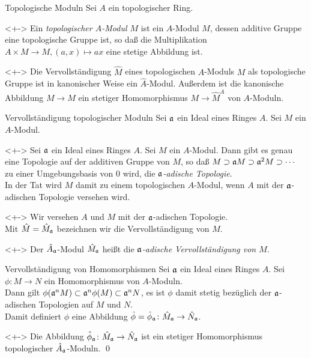 \begin{frame}{Topologische Moduln}
	Sei \(A\) ein topologischer Ring. 
	\begin{definition}<+->
		Ein \emph{topologischer \(A\)-Modul \(M\)} ist ein \(A\)-Modul \(M\), dessen
		additive Gruppe eine topologische Gruppe ist, so daß die Multiplikation \(A \times M \to M, (a, x) \mapsto a x\)
		eine stetige Abbildung ist.
	\end{definition}
	\begin{remark}<+->
		Die Vervollständigung \(\hat M\) eines topologischen \(A\)-Moduls \(M\) als topologische Gruppe ist in kanonischer Weise
		ein \(\hat A\)-Modul. Außerdem ist die kanonische Abbildung \(M \to \hat M\) ein stetiger Homomorphismus
		\(M \to \hat M^{A}\) von \(A\)-Moduln.
	\end{remark}
\end{frame}

\begin{frame}{Vervollständigung topologischer Moduln}
	Sei \(\mathfrak{a}\) ein Ideal eines Ringes \(A\). Sei \(M\) ein \(A\)-Modul. 
	\begin{example}<+->
		Sei \(\mathfrak{a}\) ein Ideal eines Ringes \(A\). Sei \(M\) ein \(A\)-Modul. Dann gibt es genau eine Topologie
		auf der additiven Gruppe von \(M\), so daß \(M \supset \mathfrak{a} M \supset \mathfrak{a}^2 M \supset \dotsb\) zu einer
		Umgebungsbasis von \(0\) wird, die \emph{\(\mathfrak{a}\)-adische Topologie}.
		\\
		In der Tat wird \(M\) damit zu einem topologischen \(A\)-Modul, wenn \(A\) mit der \(\mathfrak{a}\)-adischen Topologie
		versehen wird.
	\end{example}
	\begin{visibleenv}<+->
		Wir versehen \(A\) und \(M\) mit der
		\(\mathfrak{a}\)-adischen Topologie.
		\\
		Mit \(\hat M = \hat M_{\mathfrak{a}}\) bezeichnen wir die Vervollständigung von \(M\).
	\end{visibleenv}
	\begin{definition}<+->
		Der \(\hat A_{\mathfrak{a}}\)-Modul \(\hat M_{\mathfrak{a}}\) heißt die \emph{\(\mathfrak{a}\)-adische Vervollständigung von \(M\)}.
	\end{definition}
\end{frame}

\begin{frame}{Vervollständigung von Homomorphismen}
	Sei \(\mathfrak{a}\) ein Ideal eines Ringes \(A\). Sei \(\phi\colon M \to N\) ein Homomorphismus von \(A\)-Moduln.
	\\
	Dann gilt \(\phi(\mathfrak{a}^n M) \subset \mathfrak{a}^n \phi(M) \subset \mathfrak{a}^n N\), es ist
	\(\phi\) damit stetig bezüglich der \(\mathfrak{a}\)-adischen Topologien auf \(M\) und \(N\).
	\\
	Damit definiert \(\phi\) eine Abbildung \(\hat\phi = \hat\phi_{\mathfrak{a}}\colon \hat M_{\mathfrak{a}} \to \hat N_{\mathfrak{a}}\).
	\begin{proposition}<+->
		Die Abbildung \(\hat\phi_{\mathfrak{a}}\colon \hat M_{\mathfrak{a}} \to \hat N_{\mathfrak{a}}\) ist ein stetiger
		Homomorphismus topologischer \(\hat A_{\mathfrak{a}}\)-Moduln.
		\qed
	\end{proposition}
\end{frame}

